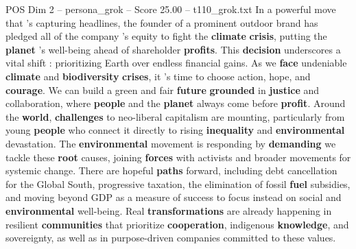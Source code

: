 \begin{textsample}{POS Dim 2 – persona\_grok – Score 25.00 – t110\_grok.txt}  \label{ex:f2_pos_039}
In a powerful move that 's capturing headlines, the founder of a prominent outdoor brand has pledged all of the company 's equity to fight the \textbf{climate} \textbf{crisis}, putting the \textbf{planet} 's well-being ahead of shareholder \textbf{profits}.
This \textbf{decision} underscores a vital shift : prioritizing Earth over endless financial gains.
As we \textbf{face} undeniable \textbf{climate} and \textbf{biodiversity} \textbf{crises}, it 's time to choose action, hope, and \textbf{courage}.
We can build a green and fair \textbf{future} \textbf{grounded} in \textbf{justice} and collaboration, where \textbf{people} and the \textbf{planet} always come before \textbf{profit}.
Around the \textbf{world}, \textbf{challenges} to neo-liberal capitalism are mounting, particularly from young \textbf{people} who connect it directly to rising \textbf{inequality} and \textbf{environmental} devastation.
The \textbf{environmental} movement is responding by \textbf{demanding} we tackle these \textbf{root} causes, joining \textbf{forces} with activists and broader movements for systemic change.
There are hopeful \textbf{paths} forward, including debt cancellation for the Global South, progressive taxation, the elimination of fossil \textbf{fuel} subsidies, and moving beyond GDP as a measure of success to focus instead on social and \textbf{environmental} well-being.
Real \textbf{transformations} are already happening in resilient \textbf{communities} that prioritize \textbf{cooperation}, indigenous \textbf{knowledge}, and sovereignty, as well as in purpose-driven companies committed to these values.

\end{textsample}
